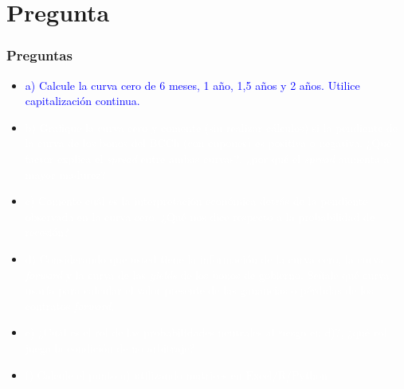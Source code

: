 \documentclass{beamer}
\begin{document}
\section{Pregunta }
  \begin{frame}
    \frametitle{Preguntas}
    \begin{itemize}
      \scriptsize
      \item {\Large\textcolor{blue}{a) Calcule la curva cero de 6 meses, 1 año, 1,5 años y 2 años. Utilice capitalización continua.}}
      \vspace{3pt}
      \item {\textcolor{white}{b) Grafique la curva cero y comente (sin realizar cálculos) si la pendiente de la curva de los bonos del BCCh (con cupones) es positiva o negativa. ¿Qué factor explica el \textit{spread} entre ambas curvas?, ¿por qué el \textit{spread} aumenta a mayor madurez?}}
      \vspace{3pt}
      \item {\textcolor{white}{c) Comente cuál es la interpretación económica detrás de la pendiente observada en la curva cero. ¿Qué nos dice respecto a la probabilidad de recesión?}}
      \vspace{3pt}
      \item {\textcolor{white}{d) Considerando que usted tiene la información de la curva cero, la curva \textit{forward} y la curva de las \textit{yields} de los bonos de gobierno. Señale qué curva usaría para calcular el valor presente de las ganancias o pérdidas de los contratos \textit{forward}.}}
      \vspace{3pt}
      \item {\textcolor{white}{e) ¿Cuál es el rol de las probabilidades neutrales al riesgo en d)?, ¿qué rol juega la condición de no arbitraje?}}
      \vspace{3pt}
      \item {\textcolor{white}{f) Calcule el punto a) utilizando matrices en Excel/R/Python.}}
      \vspace{3pt}
    \end{itemize}
  \end{frame}

\newcommand{\entero}[1]{\pgfmathprintnumber[fixed, precision=0]{#1}}
\newcommand{\decimal}[1]{\pgfmathprintnumber[fixed, precision=2]{#1}}
\newcommand{\decimalx}[1]{\pgfmathprintnumber[fixed, precision=3]{#1}}
\newcommand{\decimalxx}[1]{\pgfmathprintnumber[fixed, precision=4]{#1}}
\newcommand{\porcentaje}[1]{%
  \pgfmathsetmacro{\temp}{#1*100}%
  \pgfmathprintnumber[fixed, precision=2]{\temp}\%%
  }
\newcommand{\capcontinuacero}{ F = P \cdot e^{-rT}}
\newcommand{\capcontinua}{F = \sum_{i=1}^{n} \frac{C_i}{e^{r_i t_i}} + \frac{P}{e^{r_n t_n}}}
\end{document}
